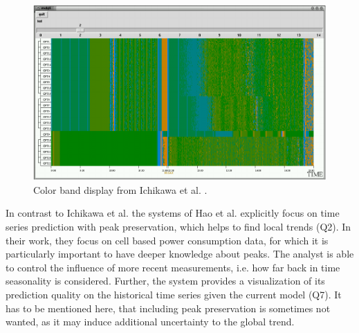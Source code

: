 \documentclass[electronic]{vgtc}             %
\begin{document}
\begin{figure}[!b]
	\centering
	\includegraphics[width=\columnwidth]{color-band}
	\caption{Color band display from Ichikawa et al. \cite{ichikawa:2002}.}
	\label{fig:color-band}
\end{figure}

In contrast to Ichikawa et al.\cite{ichikawa:2002} the systems of Hao et al. \cite{Hao:2011, Hao:2009} explicitly focus on time series prediction with peak preservation, which helps to find local trends (Q2).
In their work, they focus on cell based power consumption data, for which it is particularly important to have deeper knowledge about peaks.
The analyst is able to control the influence of more recent measurements, i.e. how far back in time seasonality is considered. 
Further, the system provides a visualization of its prediction quality on the historical time series given the current model (Q7). 
It has to be mentioned here, that including peak preservation is sometimes not wanted, as it may induce additional uncertainty to the global trend.
\end{document}
